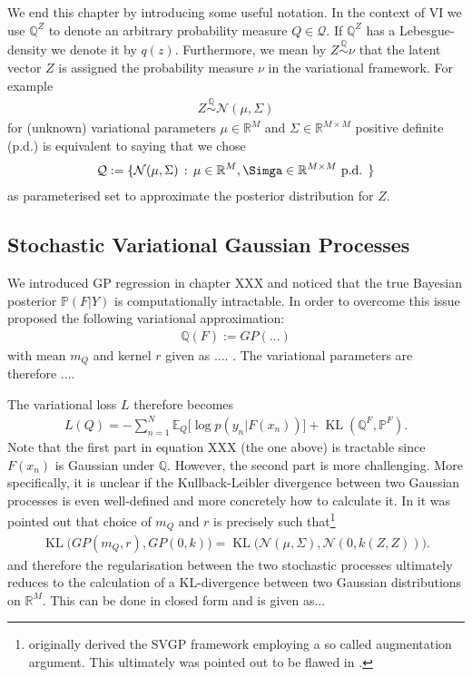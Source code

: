 \documentclass{article}
\newcommand{\bbP}{\mathbb{P}}
\newcommand{\bbR}{\mathbb{R}}
\newcommand{\bbE}{\mathbb{E}}
\newcommand{\bbQ}{\mathbb{Q}}
\newcommand{\KL}{\operatorname{KL}}
\numberwithin{equation}{section}
\begin{document}
We end this chapter by introducing some useful notation. In the context of VI we use $\bbQ^Z$ to denote an arbitrary probability measure $Q \in \mathcal{Q}$. If $\bbQ^Z$ has a Lebesgue-density we denote it by $q(z)$. Furthermore, we mean by $Z \overset{\bbQ}{\sim} \nu$ that the latent vector $Z$ is assigned the probability measure $\nu$ in the variational framework. For example 
\begin{align}
    Z \overset{\bbQ}{\sim} \mathcal{N}( \mu, \Sigma)
\end{align}
for (unknown) variational parameters $\mu \in \bbR^M$ and $\Sigma \in \bbR^{M \times M} $ positive definite (p.d.) is equivalent to saying that we chose 
\begin{align}
    \mathcal{Q}:= \{ \mathcal{N}(\mu, \Sigma) \, : \, \mu \in \bbR^M, \Simga \in \bbR^{M \times M} \text{ p.d. } \}
\end{align}
as parameterised set to approximate the posterior distribution for $Z$.

\subsection{Stochastic Variational Gaussian Processes}\label{sec:svgp}
We introduced GP regression in chapter XXX and noticed that the true Bayesian posterior $\bbP(F|Y)$ is computationally intractable. In order to overcome this issue \citet{titsias2009variational} proposed the following variational approximation:
\begin{align}
    \bbQ(F) := GP( ...)
\end{align}
with mean $m_Q$ and kernel $r$ given as .... . The variational parameters are therefore .... 

The variational loss $L$ therefore becomes 
\begin{align}
    L(Q) = - \sum_{n=1}^N \bbE_Q \big[ \log p(y_n | F(x_n)) ] + \KL(\bbQ^F, \bbP^F).
\end{align}
Note that the first part in equation XXX (the one above) is tractable since $F(x_n)$ is Gaussian under $\bbQ$. However, the second part is more challenging. More specifically, it is unclear if the Kullback-Leibler divergence between two Gaussian processes is even well-defined and more concretely how to calculate it. In \citet{matthews2016sparse} it was pointed out that \citet{titsias2009variational} choice of $m_Q$ and $r$ is precisely such that\footnote{\citet{titsias2009variational} originally derived the SVGP framework employing a so called augmentation argument. This ultimately was pointed out to be flawed in \citet{matthews2016sparse}.  } 
\begin{align}
    \KL\Big( GP(m_Q,r) , GP(0,k) \Big) = \KL\Big( \mathcal{N}(\mu, \Sigma),  \mathcal{N}(0, k(Z,Z)) \Big).
\end{align}
and therefore the regularisation between the two stochastic processes ultimately reduces to the calculation of a KL-divergence between two Gaussian distributions on $\bbR^M$. This can be done in closed form and is given as...
\end{document}
